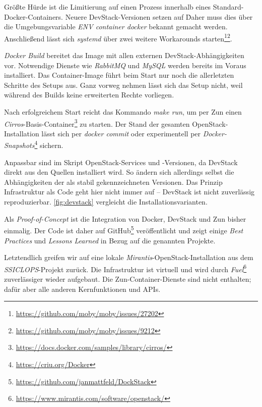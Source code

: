 \noindent Größte Hürde ist die Limitierung auf einen Prozess innerhalb eines Standard-Docker-Containers. Neuere DevStack-Versionen setzen auf \. Daher muss dies über die Umgebungsvariable \emph{ENV container docker} bekannt gemacht werden. Anschließend lässt sich \emph{systemd} über zwei weitere Workarounds starten\footnote{\url{https://github.com/moby/moby/issues/27202}}\footnote{\url{https://github.com/moby/moby/issues/9212}}.

\emph{Docker Build} bereitet das Image mit allen externen DevStack-Abhängigkeiten vor. Notwendige Dienste wie \emph{RabbitMQ} und \emph{MySQL} werden bereits im Voraus installiert. Das Container-Image führt beim Start nur noch die allerletzten Schritte des Setups aus. Ganz vorweg nehmen lässt sich das Setup nicht, weil während des Builds keine erweiterten Rechte vorliegen.

Nach erfolgreichem Start reicht das Kommando \emph{make run}, um per Zun einen \emph{Cirros}-Basis-Container\footnote{\url{https://docs.docker.com/samples/library/cirros/}} zu starten. Der Stand der gesamten OpenStack-Installation lässt sich per \emph{docker commit} oder experimentell per \emph{Docker-Snapshots}\footnote{\url{https://criu.org/Docker}} sichern.

Anpassbar sind im Skript OpenStack-Services und -Versionen, da DevStack direkt aus den Quellen installiert wird. So ändern sich allerdings selbst die Abhängigkeiten der als stabil gekennzeichneten Versionen. Das Prinzip Infrastruktur als Code geht hier nicht immer auf -- DevStack ist nicht zuverlässig reproduzierbar. \autoref{fig:devstack} vergleicht die Installationsvarianten.

Als \emph{Proof-of-Concept} ist die Integration von Docker, DevStack und Zun bisher einmalig. Der Code ist daher auf GitHub\footnote{\url{https://github.com/janmattfeld/DockStack}} veröffentlicht und zeigt einige \emph{Best Practices} und \emph{Lessons Learned} in Bezug auf die genannten Projekte.

Letztendlich greifen wir auf eine lokale \emph{Mirantis}-OpenStack-Installation aus dem \emph{SSICLOPS}-Projekt zurück. Die Infrastruktur ist virtuell und wird durch \emph{Fuel}\footnote{\url{https://www.mirantis.com/software/openstack/}} zuverlässiger wieder aufgebaut. Die Zun-Container-Dienste sind nicht enthalten; dafür aber alle anderen Kernfunktionen und APIs.
